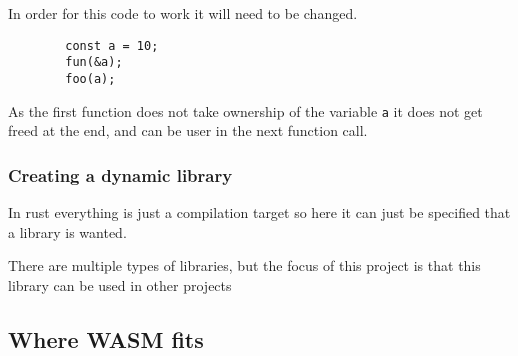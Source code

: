\documentclass[12pt, letterpaper]{article}
\begin{document}
\begin{multicols}{2}
    In order for this code to work it will need to be changed.

    \begin{lstlisting}
        const a = 10;
        fun(&a);
        foo(a);
    \end{lstlisting}

    As the first function does not take ownership of the variable \verb|a| it does not get freed at the end, and can be user in the next function call.

    \subsubsection{Creating a dynamic library}

    In rust everything is just a compilation target so here it can just be specified that a library is wanted.

    There are multiple types of libraries, but the focus of this project is that this library can be used in other projects 


    \subsection{Where WASM fits}
\end{multicols}
\end{document}
